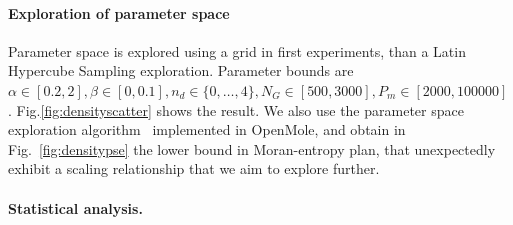 \documentclass[10pt,letterpaper]{article}
\begin{document}
\paragraph{Exploration of parameter space}

Parameter space is explored using a grid in first experiments, than a Latin Hypercube Sampling exploration. Parameter bounds are $\alpha \in [0.2,2],\beta \in [0,0.1],n_d \in \{0,\ldots , 4\}, N_G \in [500,3000], P_m \in [2000,100000]$. Fig.\ref{fig:densityscatter} shows the result. We also use the parameter space exploration algorithm~\cite{10.1371/journal.pone.0138212} implemented in OpenMole, and obtain in Fig.~\ref{fig:densitypse} the lower bound in Moran-entropy plan, that unexpectedly exhibit a scaling relationship that we aim to explore further.



%
%
%
%
%








\paragraph{Statistical analysis.}

\end{document}
